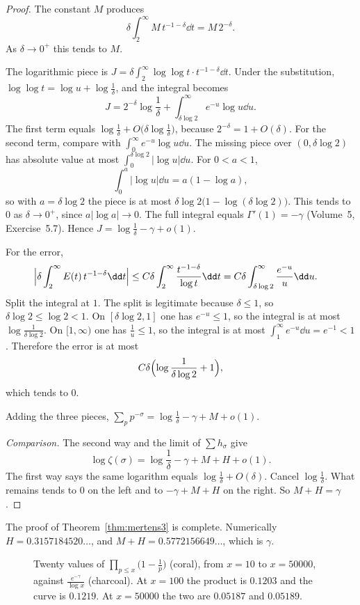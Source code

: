 \begin{proof}
The constant $M$ produces
\[
\delta\int_2^\infty M\,t^{-1-\delta}\dd t=M\,2^{-\delta}.
\]
As $\delta\to 0^+$ this tends to $M$.

The logarithmic piece is $J=\delta\int_2^\infty\log\log t\cdot t^{-1-\delta}\dd t$. Under the substitution, $\log\log t=\log u+\log\frac1\delta$, and the integral becomes
\[
J=2^{-\delta}\log\frac1\delta+\int_{\delta\log 2}^\infty e^{-u}\log u\dd u.
\]
The first term equals $\log\frac1\delta+O\bigl(\delta\log\frac1\delta\bigr)$, because $2^{-\delta}=1+O(\delta)$. For the second term, compare with $\int_0^\infty e^{-u}\log u\dd u$. The missing piece over $(0,\delta\log 2)$ has absolute value at most $\int_0^{\delta\log 2}|\log u|\dd u$. For $0<a<1$,
\[
\int_0^a|\log u|\dd u=a(1-\log a),
\]
so with $a=\delta\log 2$ the piece is at most $\delta\log 2\bigl(1-\log(\delta\log 2)\bigr)$. This tends to $0$ as $\delta\to 0^+$, since $a|\log a|\to 0$. The full integral equals $\Gamma'(1)=-\gamma$ (Volume~5, Exercise~5.7). Hence $J=\log\frac1\delta-\gamma+o(1)$.

For the error,
\begin{align*}
\Bigl|\delta\int_2^\infty E(t)\,t^{-1-\delta}\dd t\Bigr|
&\le C\delta\int_2^\infty\frac{t^{-1-\delta}}{\log t}\dd t
=C\delta\int_{\delta\log 2}^\infty\frac{e^{-u}}u\dd u.
\end{align*}
Split the integral at $1$. The split is legitimate because $\delta\le 1$, so $\delta\log 2\le\log 2<1$. On $[\delta\log 2,1]$ one has $e^{-u}\le 1$, so the integral is at most $\log\frac1{\delta\log 2}$. On $[1,\infty)$ one has $\frac1u\le 1$, so the integral is at most $\int_1^\infty e^{-u}\dd u=e^{-1}<1$. Therefore the error is at most
\[
C\delta\Bigl(\log\frac1{\delta\log 2}+1\Bigr),
\]
which tends to $0$.

Adding the three pieces, $\sum_pp^{-\sigma}=\log\frac1\delta-\gamma+M+o(1)$.

\emph{Comparison.} The second way and the limit of $\sum h_\sigma$ give
\[
\log\zeta(\sigma)=\log\frac1\delta-\gamma+M+H+o(1).
\]
The first way says the same logarithm equals $\log\frac1\delta+O(\delta)$. Cancel $\log\frac1\delta$. What remains tends to $0$ on the left and to $-\gamma+M+H$ on the right. So $M+H=\gamma$.
\end{proof}

The proof of Theorem~\ref{thm:mertens3} is complete. Numerically $H=0.3157184520\ldots$, and $M+H=0.5772156649\ldots$, which is $\gamma$.

\begin{figure}[ht]
\centering
{}
\caption{Twenty values of $\prod_{p\le x}\bigl(1-\frac1p\bigr)$ (coral), from $x=10$ to $x=50000$, against $\frac{e^{-\gamma}}{\log x}$ (charcoal). At $x=100$ the product is $0.1203$ and the curve is $0.1219$. At $x=50000$ the two are $0.05187$ and $0.05189$.}
\label{fig:product}
\end{figure}

